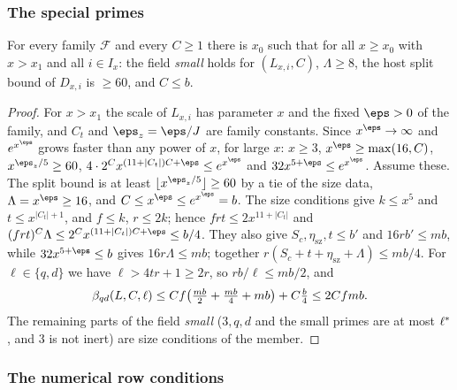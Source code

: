 \subsubsection{The special primes}

\begin{lemma}\label{pf:linkN-sel:small}
For every family $\mathcal F$ and every $C\ge1$ there is $x_0$ such that for all $x\ge x_0$ with $x>x_1$ and all $i\in I_x$: the field
\emph{small} holds for $(L_{x,i},C)$, $\Lambda\ge8$, the host split bound of $D_{x,i}$ is $\ge60$, and $C\le b$.
\end{lemma}

\begin{proof}
For $x>x_1$ the scale of $L_{x,i}$ has parameter $x$ and the fixed $\eps>0$ of the family, and $C_t$ and $\eps_z=\eps/J$ are family
constants. Since $x^{\eps}\to\infty$ and $e^{x^\eps}$ grows faster than any power of $x$, for large $x$: $x\ge3$, $x^\eps\ge\max(16,C)$,
$x^{\eps_z/5}\ge60$, $4\cdot2^Cx^{(11+|C_t|)C+\eps}\le e^{x^\eps}$ and $32x^{5+\eps}\le e^{x^\eps}$. Assume these. The split bound is at least
$\lfloor x^{\eps_z/5}\rfloor\ge60$ by a tie of the size data, $\Lambda=x^\eps\ge16$, and $C\le x^\eps\le e^{x^\eps}=b$. The size conditions
give $k\le x^5$ and $t\le x^{|C_t|+1}$, and $f\le k$, $r\le2k$; hence $frt\le2x^{11+|C_t|}$ and $(frt)^C\Lambda\le2^Cx^{(11+|C_t|)C+\eps}\le b/4$.
They also give $S_c,\eta_{\mathrm{sz}},t\le b'$ and $16rb'\le mb$, while $32x^{5+\eps}\le b$ gives $16r\Lambda\le mb$; together
$r(S_c+t+\eta_{\mathrm{sz}}+\Lambda)\le mb/4$. For $\ell\in\{q,d\}$ we have $\ell>4tr+1\ge2r$, so $rb/\ell\le mb/2$, and
\[
\beta_{qd}(L,C,\ell)\le Cf\bigl(\tfrac{mb}2+\tfrac{mb}4+mb\bigr)+C\tfrac{b}4\le2Cfmb .
\]
The remaining parts of the field \emph{small} ($3,q,d$ and the small primes are at most $\ell^{*}$, and $3$ is not inert) are size
conditions of the member.
\end{proof}

\subsubsection{The numerical row conditions}

